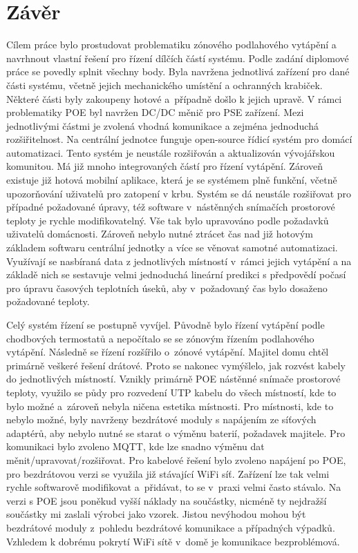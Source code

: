 \chapter{Závěr}
Cílem práce bylo prostudovat problematiku zónového podlahového vytápění a navrhnout vlastní řešení pro řízení dílčích částí systému. Podle zadání diplomové práce se povedly splnit všechny body. Byla navržena jednotlivá zařízení pro dané části systému, včetně jejich mechanického umístění a ochranných krabiček. Některé části byly zakoupeny hotové a~případně došlo k jejich upravě. V rámci problematiky POE byl navržen DC/DC měnič pro PSE zařízení. Mezi jednotlivými částmi je zvolená vhodná komunikace a zejména jednoduchá rozšiřitelnost. Na centrální jednotce funguje open-source řídicí systém pro domácí automatizaci. Tento systém je neustále rozšiřován a aktualizován vývojářskou komunitou. Má již mnoho integrovaných částí pro řízení vytápění. Zároveň existuje již hotová mobilní aplikace, která je se systémem plně funkční, včetně upozorňování uživatelů pro zatopení v krbu. Systém se dá neustále rozšiřovat pro případné požadované úpravy, též software v~nástěnných snímačích prostorové teploty je rychle modifikovatelný. Vše tak bylo upravováno podle požadavků uživatelů domácnosti. Zároveň nebylo nutné ztrácet čas nad již hotovým základem softwaru centrální jednotky a více se věnovat samotné automatizaci. Využívají se nasbíraná data z jednotlivých místností v~rámci jejich vytápění a na základě nich se sestavuje velmi jednoduchá lineární predikci s předpovědí počasí pro úpravu časových teplotních úseků, aby v~požadovaný čas bylo dosaženo požadované teploty. 

Celý systém řízení se postupně vyvíjel. Původně bylo řízení vytápění podle chodbových termostatů a nepočítalo se se zónovým řízením podlahového vytápění. Následně se řízení rozšířilo o~zónové vytápění. Majitel domu chtěl primárně veškeré řešení drátové. Proto se nakonec vymýšlelo, jak rozvést kabely do jednotlivých místností. Vznikly primárně POE nástěnné snímače prostorové teploty, využilo se půdy pro rozvedení UTP kabelu do všech místností, kde to bylo možné a~zároveň nebyla ničena estetika místnosti. Pro místnosti, kde to nebylo možné, byly navrženy bezdrátové moduly s napájením ze síťových adaptérů, aby nebylo nutné se starat o výměnu baterií, požadavek majitele. Pro komunikaci bylo zvoleno MQTT, kde lze snadno výměnu dat měnit/upravovat/rozšiřovat. Pro kabelové řešení bylo zvoleno napájení po POE, pro bezdrátovou verzi se využila již stávající WiFi síť. Zařízení lze tak velmi rychle softwarově modifikovat a~přidávat, to se v~praxi velmi často stávalo. Na verzi s POE jsou poněkud vyšší náklady na součástky, nicméně ty nejdražší součástky mi zaslali výrobci jako vzorek. Jistou nevýhodou mohou být bezdrátové moduly z~pohledu bezdrátové komunikace a případných výpadků. Vzhledem k dobrému pokrytí WiFi sítě v~domě je komunikace bezproblémová.


